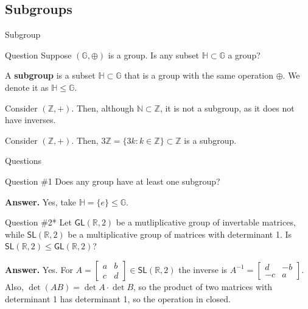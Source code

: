 \documentclass{beamer}
\begin{document}
    \subsection{Subgroups}
    \begin{frame}{Subgroup}

      \begin{alertblock}{Question}
          Suppose $(\mathbb{G}, \oplus)$ is a group. Is any subset $\mathbb{H} \subset \mathbb{G}$ a group?
      \end{alertblock}

      \begin{definition}
          A \textbf{subgroup} is a subset $\mathbb{H} \subset \mathbb{G}$ that is a group with the same operation $\oplus$. We denote it as $\mathbb{H} \leq \mathbb{G}$.
      \end{definition}

      \begin{example}
          Consider $(\mathbb{Z}, +)$. Then, although $\mathbb{N} \subset \mathbb{Z}$, it is not a subgroup, as it does not have inverses.
      \end{example}

      \begin{example}
          Consider $(\mathbb{Z}, +)$. Then, $3\mathbb{Z} = \{3k: k \in \mathbb{Z}\} \subset \mathbb{Z}$ is a subgroup.
      \end{example}
  \end{frame}

  \begin{frame}{Questions}
    \begin{alertblock}{Question \#1}
      Does any group have at least one subgroup?
    \end{alertblock}

    \textbf{Answer.} Yes, take $\mathbb{H} = \{e\} \leq \mathbb{G}$.

    \begin{alertblock}{Question \#2*}
      Let $\mathsf{GL}(\mathbb{R},2)$ be a mutliplicative group of invertable matrices, while $\mathsf{SL}(\mathbb{R},2)$ be a multiplicative group of matrices with determinant 1. Is $\mathsf{SL}(\mathbb{R},2) \leq \mathsf{GL}(\mathbb{R},2)$?
    \end{alertblock}

    \textbf{Answer.} Yes. For $A = \begin{bmatrix}
      a & b \\
      c & d
    \end{bmatrix} \in \mathsf{SL}(\mathbb{R},2)$ the inverse is $A^{-1} = \begin{bmatrix}
      d & -b \\ -c & a
    \end{bmatrix}$. Also, $\det (AB) = \det A \cdot \det B$, so the product of two matrices with determinant 1 has determinant 1, so the operation in closed.
  \end{frame}
\end{document}
